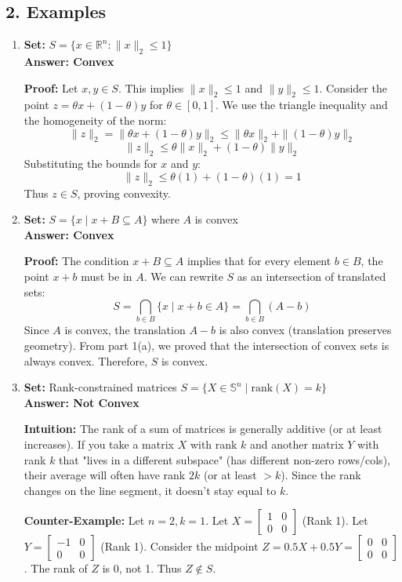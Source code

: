 \documentclass[12pt]{article}
\begin{document}
\subsection*{2. Examples}

\begin{enumerate}
    \item[(a)] \textbf{Set:} $S = \{x \in \mathbb{R}^n : \|x\|_2 \le 1\}$ \\
    \textbf{Answer: Convex}
    
    \textbf{Proof:}
    Let $x, y \in S$. This implies $\|x\|_2 \le 1$ and $\|y\|_2 \le 1$.
    Consider the point $z = \theta x + (1-\theta)y$ for $\theta \in [0,1]$.
    We use the triangle inequality and the homogeneity of the norm:
    $$ \|z\|_2 = \|\theta x + (1-\theta)y\|_2 \le \|\theta x\|_2 + \|(1-\theta)y\|_2 $$
    $$ \|z\|_2 \le \theta\|x\|_2 + (1-\theta)\|y\|_2 $$
    Substituting the bounds for $x$ and $y$:
    $$ \|z\|_2 \le \theta(1) + (1-\theta)(1) = 1 $$
    Thus $z \in S$, proving convexity.

    \item[(b)] \textbf{Set:} $S = \{x \mid x + B \subseteq A\}$ where $A$ is convex \\
    \textbf{Answer: Convex}
    
    \textbf{Proof:}
    The condition $x + B \subseteq A$ implies that for every element $b \in B$, the point $x+b$ must be in $A$.
    We can rewrite $S$ as an intersection of translated sets:
    $$ S = \bigcap_{b \in B} \{x \mid x + b \in A\} = \bigcap_{b \in B} (A - b) $$
    Since $A$ is convex, the translation $A-b$ is also convex (translation preserves geometry).
    From part 1(a), we proved that the intersection of convex sets is always convex. Therefore, $S$ is convex.

    \item[(c)] \textbf{Set:} Rank-constrained matrices $S = \{X \in \mathbb{S}^n \mid \text{rank}(X) = k\}$ \\
    \textbf{Answer: Not Convex}
    
    \textbf{Intuition:} 
    The rank of a sum of matrices is generally additive (or at least increases). If you take a matrix $X$ with rank $k$ and another matrix $Y$ with rank $k$ that "lives in a different subspace" (has different non-zero rows/cols), their average will often have rank $2k$ (or at least $>k$). Since the rank changes on the line segment, it doesn't stay equal to $k$.
    
    \textbf{Counter-Example:}
    Let $n=2, k=1$.
    Let $X = \begin{bmatrix} 1 & 0 \\ 0 & 0 \end{bmatrix}$ (Rank 1).
    Let $Y = \begin{bmatrix} -1 & 0 \\ 0 & 0 \end{bmatrix}$ (Rank 1).
    Consider the midpoint $Z = 0.5X + 0.5Y = \begin{bmatrix} 0 & 0 \\ 0 & 0 \end{bmatrix}$.
    The rank of $Z$ is 0, not 1. Thus $Z \notin S$.


\end{enumerate}
\end{document}
